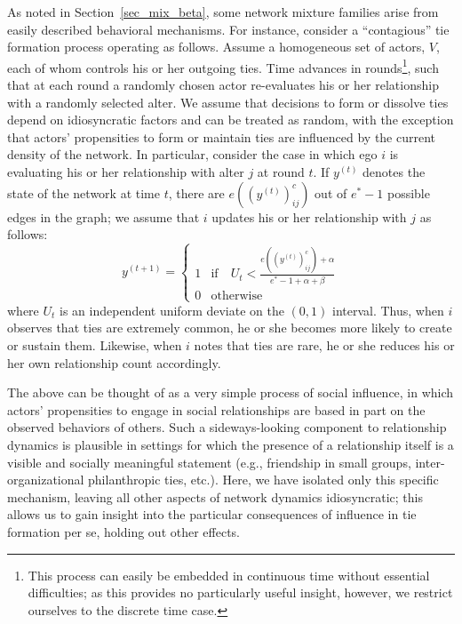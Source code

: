 \documentclass[11pt]{article}
\begin{document}
As noted in Section~\ref{sec_mix_beta}, some network mixture families arise from easily described behavioral mechanisms.  For instance, consider a ``contagious'' tie formation process \citep[in the behavioral sense of][]{coleman:bk:1964} operating as follows.  Assume a homogeneous set of actors, $V$, each of whom controls his or her outgoing ties.  Time advances in rounds\footnote{This process can easily be embedded in continuous time without essential difficulties; as this provides no particularly useful insight, however, we restrict ourselves to the discrete time case.}, such that at each round a randomly chosen actor re-evaluates his or her relationship with a randomly selected alter.  We assume that decisions to form or dissolve ties depend on idiosyncratic factors and can be treated as random, with the exception that actors' propensities to form or maintain ties are influenced by the current density of the network.                 In particular, consider the case in which ego $i$ is evaluating his or her relationship with alter $j$ at round $t$.  If $y^{(t)}$ denotes the state of the network at time $t$, there are $e((y^{(t)})^c_{ij})$ out of $e^*-1$ possible edges in the graph; we assume that $i$ updates his or her relationship with $j$ as follows:
\begin{equation}
y^{(t+1)} = \begin{cases}1 & \mathrm{if}\quad U_t < \frac{e((y^{(t)})^c_{ij})+\alpha}{e^*-1+\alpha+\beta}\\ 0 & \mathrm{otherwise} \end{cases} \label{e_contagion}
\end{equation}
where $U_t$ is an independent uniform deviate on the $(0,1)$ interval.  Thus, when $i$ observes that ties are extremely common, he or she becomes more likely to create or sustain them.  Likewise, when $i$ notes that ties are rare, he or she reduces his or her own relationship count accordingly.  

The above can be thought of as a very simple process of social influence, in which actors' propensities to engage in social relationships are based in part on the observed behaviors of others.  Such a sideways-looking component to relationship dynamics is plausible in settings for which the presence of a relationship itself is a visible and socially meaningful statement (e.g., friendship in small groups, inter-organizational philanthropic ties, etc.).  Here, we have isolated only this specific mechanism, leaving all other aspects of network dynamics idiosyncratic; this allows us to gain insight into the particular consequences of influence in tie formation per se, holding out other effects.
\end{document}
